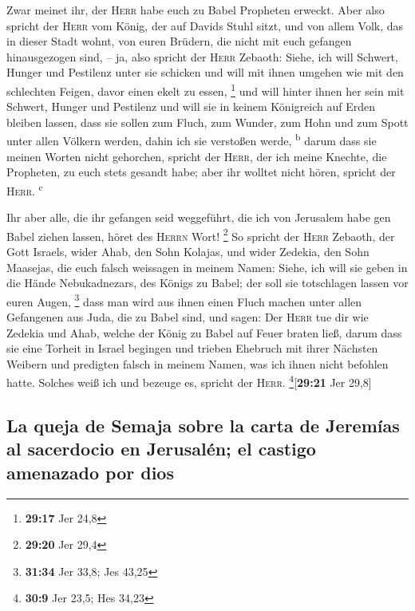  Zwar meinet ihr, der \textsc{Herr} habe euch zu Babel
Propheten erweckt.  Aber also spricht der \textsc{Herr}
vom König, der auf Davids Stuhl sitzt, und von allem Volk, das in dieser
Stadt wohnt, von euren Brüdern, die nicht mit euch gefangen
hinausgezogen sind,  -- ja, also spricht der
\textsc{Herr} Zebaoth: Siehe, ich will Schwert, Hunger und Pestilenz
unter sie schicken und will mit ihnen umgehen wie mit den schlechten
Feigen, davor einen ekelt zu essen, \footnote{\textbf{29:17} Jer 24,8}
 und will hinter ihnen her sein mit Schwert, Hunger und
Pestilenz und will sie in keinem Königreich auf Erden bleiben lassen,
dass sie sollen zum Fluch, zum Wunder, zum Hohn und zum Spott unter
allen Völkern werden, dahin ich sie verstoßen werde, \textsuperscript{b}
 darum dass sie meinen Worten nicht gehorchen, spricht
der \textsc{Herr}, der ich meine Knechte, die Propheten, zu euch stets
gesandt habe; aber ihr wolltet nicht hören, spricht der \textsc{Herr}.
\textsuperscript{c}

 Ihr aber alle, die ihr gefangen seid weggeführt, die ich
von Jerusalem habe gen Babel ziehen lassen, höret des \textsc{Herrn}
Wort! \footnote{\textbf{29:20} Jer 29,4}  So spricht der
\textsc{Herr} Zebaoth, der Gott Israels, wider Ahab, den Sohn Kolajas,
und wider Zedekia, den Sohn Maasejas, die euch falsch weissagen in
meinem Namen: Siehe, ich will sie geben in die Hände Nebukadnezars, des
Königs zu Babel; der soll sie totschlagen lassen vor euren Augen,
\footnote{\textbf{31:34} Jer 33,8; Jes 43,25}  dass man
wird aus ihnen einen Fluch machen unter allen Gefangenen aus Juda, die
zu Babel sind, und sagen: Der \textsc{Herr} tue dir wie Zedekia und
Ahab, welche der König zu Babel auf Feuer braten ließ, 
darum dass sie eine Torheit in Israel begingen und trieben Ehebruch mit
ihrer Nächsten Weibern und predigten falsch in meinem Namen, was ich
ihnen nicht befohlen hatte. Solches weiß ich und bezeuge es, spricht der
\textsc{Herr}. \footnote{\textbf{30:9} Jer 23,5; Hes 34,23}{[}\textbf{29:21}
Jer 29,8{]}

\hypertarget{la-queja-de-semaja-sobre-la-carta-de-jeremuxedas-al-sacerdocio-en-jerusaluxe9n-el-castigo-amenazado-por-dios}{%
\subsection{La queja de Semaja sobre la carta de Jeremías al sacerdocio
en Jerusalén; el castigo amenazado por
dios}\label{la-queja-de-semaja-sobre-la-carta-de-jeremuxedas-al-sacerdocio-en-jerusaluxe9n-el-castigo-amenazado-por-dios}}

